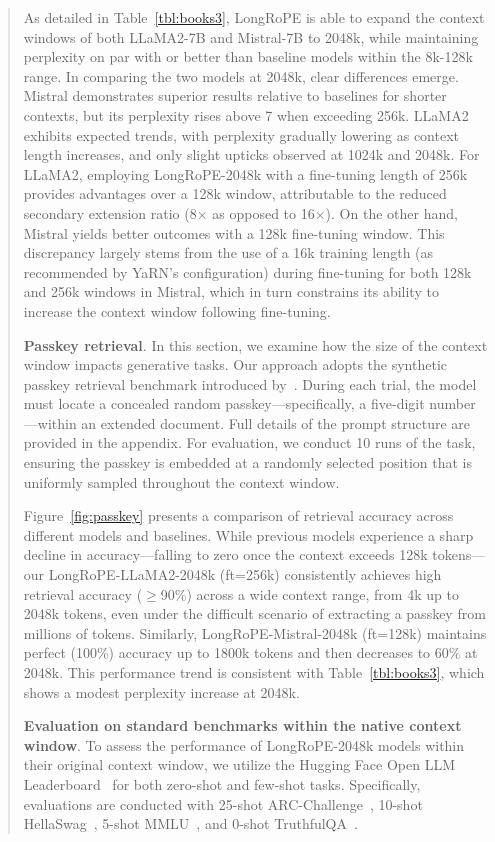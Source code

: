 \begin{abstract}
As detailed in Table~\ref{tbl:books3}, LongRoPE is able to expand the context windows of both LLaMA2-7B and Mistral-7B to 2048k, while maintaining perplexity on par with or better than baseline models within the 8k-128k range. In comparing the two models at 2048k, clear differences emerge. Mistral demonstrates superior results relative to baselines for shorter contexts, but its perplexity rises above 7 when exceeding 256k. LLaMA2 exhibits expected trends, with perplexity gradually lowering as context length increases, and only slight upticks observed at 1024k and 2048k. For LLaMA2, employing LongRoPE-2048k with a fine-tuning length of 256k provides advantages over a 128k window, attributable to the reduced secondary extension ratio (8$\times$ as opposed to 16$\times$). On the other hand, Mistral yields better outcomes with a 128k fine-tuning window. This discrepancy largely stems from the use of a 16k training length (as recommended by YaRN's configuration) during fine-tuning for both 128k and 256k windows in Mistral, which in turn constrains its ability to increase the context window following fine-tuning.

\textbf{Passkey retrieval}. In this section, we examine how the size of the context window impacts generative tasks. Our approach adopts the synthetic passkey retrieval benchmark introduced by~\cite{passkey}. During each trial, the model must locate a concealed random passkey—specifically, a five-digit number—within an extended document. Full details of the prompt structure are provided in the appendix. For evaluation, we conduct 10 runs of the task, ensuring the passkey is embedded at a randomly selected position that is uniformly sampled throughout the context window.

Figure~\ref{fig:passkey} presents a comparison of retrieval accuracy across different models and baselines. While previous models experience a sharp decline in accuracy—falling to zero once the context exceeds 128k tokens—our LongRoPE-LLaMA2-2048k (ft=256k) consistently achieves high retrieval accuracy ($\ge$90\%) across a wide context range, from 4k up to 2048k tokens, even under the difficult scenario of extracting a passkey from millions of tokens. Similarly, LongRoPE-Mistral-2048k (ft=128k) maintains perfect (100\%) accuracy up to 1800k tokens and then decreases to 60\% at 2048k. This performance trend is consistent with Table~\ref{tbl:books3}, which shows a modest perplexity increase at 2048k.

\textbf{Evaluation on standard benchmarks within the native context window}. To assess the performance of LongRoPE-2048k models within their original context window, we utilize the Hugging Face Open LLM Leaderboard~\cite{huggingfaceboard} for both zero-shot and few-shot tasks. Specifically, evaluations are conducted with 25-shot ARC-Challenge~\cite{allenai:arc}, 10-shot HellaSwag~\cite{zellers2019hellaswag}, 5-shot MMLU~\cite{mmlu}, and 0-shot TruthfulQA~\cite{lin2021truthfulqa}.


\end{abstract}
